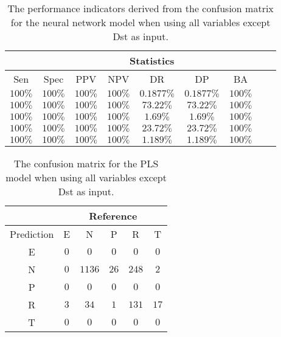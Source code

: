 \begin{table}[!ht]
	\centering
	\begin{tabular}{|c|c|c|c|c|c|c|c|c|}
		\hline
		 & \multicolumn{7}{c|}{Statistics} \\ \hline
		Sen & Spec & PPV & NPV & DR & DP & BA \\ \hline
		$100\%$ & $100\%$ & $100\%$ & $100\%$ & $0.1877\%$ & $0.1877\%$ & $100\%$ \\ \hline
		$100\%$ & $100\%$ & $100\%$ & $100\%$ & $73.22\%$ & $73.22\%$ & $100\%$ \\ \hline
		$100\%$ & $100\%$ & $100\%$ & $100\%$ & $1.69\%$ & $1.69\%$ & $100\%$ \\ \hline
		$100\%$ & $100\%$ & $100\%$ & $100\%$ & $23.72\%$ & $23.72\%$ & $100\%$ \\ \hline
		$100\%$ & $100\%$ & $100\%$ & $100\%$ & $1.189\%$ & $1.189\%$ & $100\%$ \\ \hline
	\end{tabular}
	\caption{The performance indicators derived from the confusion matrix for the neural network model when using all variables except Dst as input.}
	\label{tab:cs:noDst:nnet}
\end{table}

\begin{table}[!ht]
	\centering
	\begin{tabular}{|c|c|c|c|c|c|}
		\hline
		 & \multicolumn{5}{|c|}{Reference} \\ \hline
		 Prediction & E & N & P & R & T \\ \hline
		 E & $0$ & $0$ & $0$ & $0$ & $0$ \\ \hline
		 N & $0$ & $1136$ & $26$ & $248$ & $2$ \\ \hline
		 P & $0$ & $0$ & $0$ & $0$ & $0$ \\ \hline
		 R & $3$ & $34$ & $1$ & $131$ & $17$ \\ \hline
		 T & $0$ & $0$ & $0$ & $0$ & $0$ \\ \hline
	\end{tabular}
	\caption{The confusion matrix for the PLS model when using all variables except Dst as input.}
	\label{tab:cm:noDst:pls}
\end{table}

